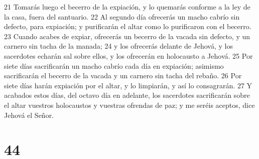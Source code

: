 21 Tomarás luego el becerro de la expiación, y lo quemarás conforme a la ley de la casa, fuera del santuario.
22 Al segundo día ofrecerás un macho cabrío sin defecto, para expiación; y purificarán el altar como lo purificaron con el becerro.
23 Cuando acabes de expiar, ofrecerás un becerro de la vacada sin defecto, y un carnero sin tacha de la manada;
24 y los ofrecerás delante de Jehová, y los sacerdotes echarán sal sobre ellos, y los ofrecerán en holocausto a Jehová.
25 Por siete días sacrificarán un macho cabrío cada día en expiación; asimismo sacrificarán el becerro de la vacada y un carnero sin tacha del rebaño.
26 Por siete días harán expiación por el altar, y lo limpiarán, y así lo consagrarán.
27 Y acabados estos días, del octavo día en adelante, los sacerdotes sacrificarán sobre el altar vuestros holocaustos y vuestras ofrendas de paz; y me seréis aceptos, dice Jehová el Señor. 

\chapter{44}

